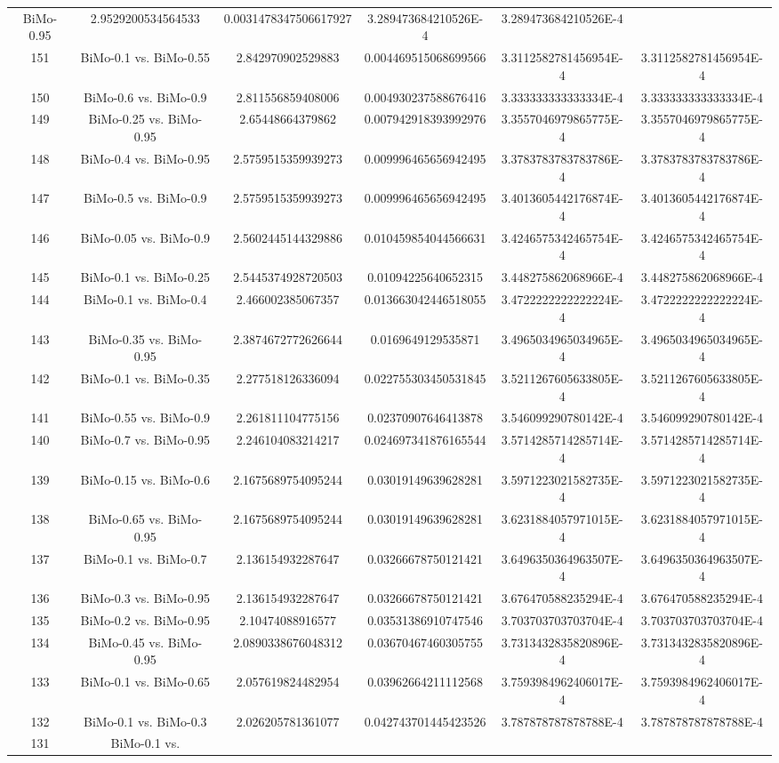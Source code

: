 \documentclass[a4paper,10pt]{article}
\begin{document}
\begin{landscape}
\begin{table}[!htp]
\begin{tabular}{cccccc}
BiMo-0.95&2.9529200534564533&0.0031478347506617927&3.289473684210526E-4&3.289473684210526E-4\\151&BiMo-0.1 vs. BiMo-0.55&2.842970902529883&0.004469515068699566&3.3112582781456954E-4&3.3112582781456954E-4\\150&BiMo-0.6 vs. BiMo-0.9&2.811556859408006&0.004930237588676416&3.333333333333334E-4&3.333333333333334E-4\\149&BiMo-0.25 vs. BiMo-0.95&2.65448664379862&0.007942918393992976&3.3557046979865775E-4&3.3557046979865775E-4\\148&BiMo-0.4 vs. BiMo-0.95&2.5759515359939273&0.009996465656942495&3.3783783783783786E-4&3.3783783783783786E-4\\147&BiMo-0.5 vs. BiMo-0.9&2.5759515359939273&0.009996465656942495&3.4013605442176874E-4&3.4013605442176874E-4\\146&BiMo-0.05 vs. BiMo-0.9&2.5602445144329886&0.010459854044566631&3.4246575342465754E-4&3.4246575342465754E-4\\145&BiMo-0.1 vs. BiMo-0.25&2.5445374928720503&0.01094225640652315&3.448275862068966E-4&3.448275862068966E-4\\144&BiMo-0.1 vs. BiMo-0.4&2.466002385067357&0.013663042446518055&3.4722222222222224E-4&3.4722222222222224E-4\\143&BiMo-0.35 vs. BiMo-0.95&2.3874672772626644&0.0169649129535871&3.4965034965034965E-4&3.4965034965034965E-4\\142&BiMo-0.1 vs. BiMo-0.35&2.277518126336094&0.022755303450531845&3.5211267605633805E-4&3.5211267605633805E-4\\141&BiMo-0.55 vs. BiMo-0.9&2.261811104775156&0.02370907646413878&3.546099290780142E-4&3.546099290780142E-4\\140&BiMo-0.7 vs. BiMo-0.95&2.246104083214217&0.024697341876165544&3.5714285714285714E-4&3.5714285714285714E-4\\139&BiMo-0.15 vs. BiMo-0.6&2.1675689754095244&0.03019149639628281&3.5971223021582735E-4&3.5971223021582735E-4\\138&BiMo-0.65 vs. BiMo-0.95&2.1675689754095244&0.03019149639628281&3.6231884057971015E-4&3.6231884057971015E-4\\137&BiMo-0.1 vs. BiMo-0.7&2.136154932287647&0.03266678750121421&3.6496350364963507E-4&3.6496350364963507E-4\\136&BiMo-0.3 vs. BiMo-0.95&2.136154932287647&0.03266678750121421&3.676470588235294E-4&3.676470588235294E-4\\135&BiMo-0.2 vs. BiMo-0.95&2.10474088916577&0.03531386910747546&3.703703703703704E-4&3.703703703703704E-4\\134&BiMo-0.45 vs. BiMo-0.95&2.0890338676048312&0.03670467460305755&3.7313432835820896E-4&3.7313432835820896E-4\\133&BiMo-0.1 vs. BiMo-0.65&2.057619824482954&0.03962664211112568&3.7593984962406017E-4&3.7593984962406017E-4\\132&BiMo-0.1 vs. BiMo-0.3&2.026205781361077&0.042743701445423526&3.787878787878788E-4&3.787878787878788E-4\\131&BiMo-0.1 vs. 
\end{tabular}
\end{table}
\end{landscape}
\end{document}

